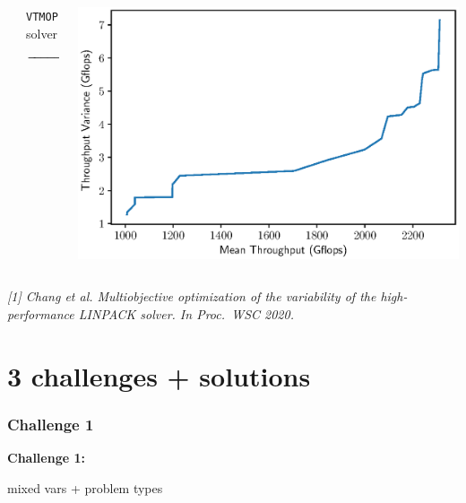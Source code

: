 \documentclass[aspectratio=169]{beamer}
\begin{document}
\begin{frame}
\begin{columns}
\begin{column}{.3\textwidth}
\begin{center}
\end{center}
\end{column}
\begin{column}{.2\textwidth}
\begin{center}
{\tt VTMOP} solver
$$\xrightarrow{\hspace*{2cm}}$$
\end{center}
\end{column}
\begin{column}{.4\textwidth}
\includegraphics[width=\textwidth]{../img/moo_old/hpl_n20k_pf.eps}
\end{column}
\end{columns}

\vfill

{\tiny\it
[1] Chang et al.
Multiobjective optimization of the variability of the high-performance 
LINPACK solver.
{\sl In Proc.\ WSC 2020.}\\
}
\end{frame}

\section{3 challenges + solutions}

\begin{frame}\frametitle{Challenge 1}
\vfill
\begin{center}
{\Huge \bf
Challenge 1:\\

\bigskip

mixed vars + problem types
}
\end{center}
\vfill
\end{frame}
\end{document}

